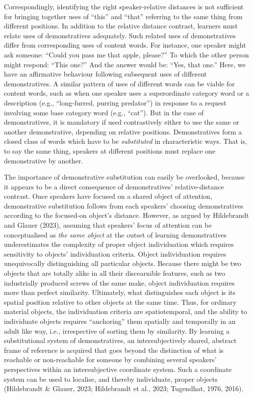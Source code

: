 \documentclass[
  man,floatsintext]{apa6}
\begin{document}
Correspondingly, identifying the right speaker-relative distances is not sufficient for bringing together uses of ``this'' and ``that'' referring to the same thing from different positions. In addition to the relative distance contrast, learners must relate uses of demonstratives adequately. Such related uses of demonstratives differ from corresponding uses of content words. For instance, one speaker might ask someone: ``Could you pass me that apple, please?'' To which the other person might respond: ``This one?'' And the answer would be: ``Yes, that one.'' Here, we have an affirmative behaviour following subsequent uses of different demonstratives. A similar pattern of uses of different words can be viable for content words, such as when one speaker uses a superordinate category word or a description (e.g., ``long-furred, purring predator'') in response to a request involving some base category word (e.g., ``cat''). But in the case of demonstratives, it is mandatory if used contrastively either to use the same or another demonstrative, depending on relative positions. Demonstratives form a closed class of words which have to be \emph{substituted} in characteristic ways. That is, to say the same thing, speakers at different positions must replace one demonstrative by another.

The importance of demonstrative substitution can easily be overlooked, because it appears to be a direct consequence of demonstratives' relative-distance contrast. Once speakers have focused on a shared object of attention, demonstrative substitution follows from each speakers' choosing demonstratives according to the focused-on object's distance. However, as argued by Hildebrandt and Glauer (2023), assuming that speakers' focus of attention can be conceptualised as \emph{the same object} at the outset of learning demonstratives underestimates the complexity of proper object individuation which requires sensitivity to objects' individuation criteria. Object individuation requires unequivocally distinguishing all particular objects. Because there might be two objects that are totally alike in all their discearnible features, such as two industrially produced screws of the same make, object individuation requires more than perfect similarity. Ultimately, what distinguishes each object is its spatial position relative to other objects at the same time. Thus, for ordinary material objects, the individuation criteria are spatiotemporal, and the ability to individuate objects requires ``anchoring'' them spatially and temporally in an adult like way, i.e., irrespective of sorting them by similarity. By learning a substitutional system of demonstratives, an intersubjectively shared, abstract frame of reference is acquired that goes beyond the distinction of what is reachable or non-reachable for someone by combining several speakers' perspectives within an intersubjective coordinate system. Such a coordinate system can be used to localise, and thereby individuate, proper objects (Hildebrandt \& Glauer, 2023; Hildebrandt et al., 2023; Tugendhat, 1976, 2016).
\end{document}
